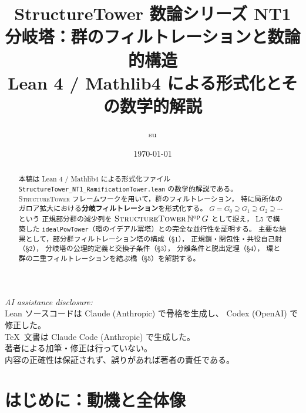 \documentclass[a4paper,11pt]{ltjsarticle}
\theoremstyle{definition}
\theoremstyle{plain}
\theoremstyle{remark}
\begin{document}
\title{%
  {\LARGE\sffamily\bfseries StructureTower 数論シリーズ NT1}\\[0.5em]
  {\large\sffamily 分岐塔：群のフィルトレーションと数論的構造}\\[0.3em]
  {\normalsize\sffamily Lean 4 / Mathlib4 による形式化とその数学的解説}%
}
\author{su}
\date{\today}
\maketitle
\thispagestyle{fancy}

\begin{center}
\small
\textit{AI assistance disclosure:}\\
Lean ソースコードは Claude (Anthropic) で骨格を生成し、
Codex (OpenAI) で修正した。\\
\TeX\ 文書は Claude Code (Anthropic) で生成した。\\
著者による加筆・修正は行っていない。\\
内容の正確性は保証されず、誤りがあれば著者の責任である。
\end{center}

\vspace{1em}

\begin{abstract}
本稿は Lean 4 / Mathlib4 による形式化ファイル
\texttt{StructureTower\_NT1\_RamificationTower.lean} の数学的解説である。
\textsc{StructureTower} フレームワークを用いて，群のフィルトレーション，
特に局所体のガロア拡大における\textbf{分岐フィルトレーション}を形式化する。
$G = G_0 \supseteq G_1 \supseteq G_2 \supseteq \cdots$ という
正規部分群の減少列を $\textsc{StructureTower}\,\mathbb{N}^{\mathrm{op}}\,G$ として捉え，
L5 で構築した \texttt{idealPowTower}（環のイデアル冪塔）との完全な並行性を証明する。
主要な結果として，部分群フィルトレーション塔の構成（§1），
正規鎖・閉包性・共役自己射（§2），
分岐塔の公理的定義と交換子条件（§3），
分離条件と脱出定理（§4），
環と群の二重フィルトレーションを結ぶ橋（§5）を解説する。
\end{abstract}

\tableofcontents
\newpage

\section{はじめに：動機と全体像}
\end{document}
